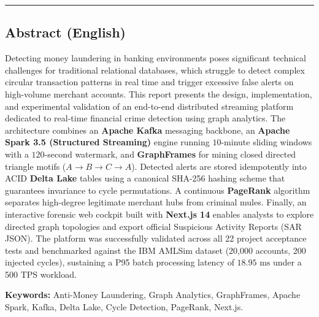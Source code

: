 \vspace{0.5cm}
\hrule
\vspace{0.3cm}

\subsection*{Abstract (English)}

Detecting money laundering in banking environments poses significant technical challenges for traditional relational databases, which struggle to detect complex circular transaction patterns in real time and trigger excessive false alerts on high-volume merchant accounts. This report presents the design, implementation, and experimental validation of an end-to-end distributed streaming platform dedicated to real-time financial crime detection using graph analytics. The architecture combines an \textbf{Apache Kafka} messaging backbone, an \textbf{Apache Spark 3.5 (Structured Streaming)} engine running $10$-minute sliding windows with a $120$-second watermark, and \textbf{GraphFrames} for mining closed directed triangle motifs ($A \to B \to C \to A$). Detected alerts are stored idempotently into ACID \textbf{Delta Lake} tables using a canonical SHA-256 hashing scheme that guarantees invariance to cycle permutations. A continuous \textbf{PageRank} algorithm separates high-degree legitimate merchant hubs from criminal mules. Finally, an interactive forensic web cockpit built with \textbf{Next.js 14} enables analysts to explore directed graph topologies and export official Suspicious Activity Reports (SAR JSON). The platform was successfully validated across all 22 project acceptance tests and benchmarked against the IBM AMLSim dataset (20,000 accounts, 200 injected cycles), sustaining a P95 batch processing latency of $18.95\text{ ms}$ under a 500 TPS workload.

\vspace{0.2cm}
\noindent\textbf{Keywords:} Anti-Money Laundering, Graph Analytics, GraphFrames, Apache Spark, Kafka, Delta Lake, Cycle Detection, PageRank, Next.js.

\newpage
